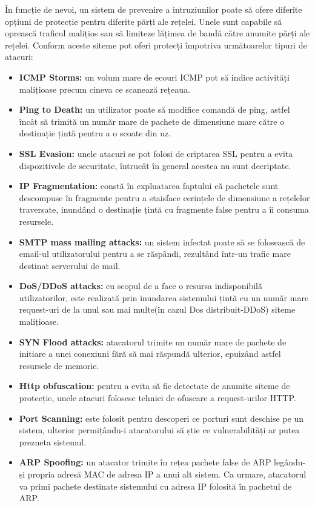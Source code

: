 În funcție de nevoi, un sistem de prevenire a intruziunilor poate să ofere diferite opțiuni de protecție pentru diferite părți ale rețelei. Unele sunt capabile să oprească traficul malițios sau să limiteze lățimea de bandă către anumite părți ale rețelei. Conform \cite{ips_sec_types} aceste siteme pot oferi protecți împotriva următoarelor tipuri de atacuri: 
\begin{itemize}
	\item \textbf{ICMP Storms:}  un volum mare de ecouri ICMP pot să indice activități malițioase precum cineva ce scanează rețeaua. 
	\item \textbf{Ping to Death:}  un utilizator poate să modifice comandă de ping, astfel încât să trimită un număr mare de pachete de dimensiune mare către o destinație țintă pentru a o scoate din uz. 
	\item \textbf{SSL Evasion:}  unele atacuri se pot folosi de criptarea SSL pentru a evita dispozitivele de securitate, întrucât în general acestea nu sunt decriptate. 
	\item \textbf{IP Fragmentation:}  constă în expluatarea faptului că pachetele sunt descompuse în fragmente pentru a staisface cerințele de dimensiune a rețelelor traversate, inundând o destinație țintă cu fragmente false pentru a îi consuma resursele.  
	\item \textbf{SMTP mass mailing attacks:}  un sistem infectat poate să se folosească de email-ul utilizatorului pentru a se răspândi, rezultând într-un trafic mare destinat serverului de mail. 
	\item \textbf{DoS/DDoS attacks:} cu scopul de a face o resursa indisponibilă utilizatorilor, este realizată prin inundarea sistemului țintă cu un număr mare request-uri de la unul sau mai multe(în cazul Dos distribuit-DDoS) siteme malițioase. 
	\item \textbf{SYN Flood attacks:}  atacatorul trimite un număr mare de pachete de initiare a unei conexiuni fără să mai răspundă ulterior, epuizând astfel resursele de memorie. 
	\item \textbf{Http obfuscation:}  pentru a evita să fie detectate de anumite siteme de protecție, unele atacuri folosesc tehnici de ofuscare a request-urilor HTTP. 
	\item \textbf{Port Scanning:}  este folosit pentru descoperi ce porturi sunt deschise pe un sistem, ulterior permițându-i atacatorului să știe ce vulnerabilități ar putea prezneta sistemul. 
	\item \textbf{ARP Spoofing:}  un atacator trimite în rețea pachete false de ARP legându-și propria adresă MAC de adresa IP a unui alt sistem. Ca urmare, atacatorul va primi pachete destinate sistemului cu adresa IP folosită în pachetul de ARP. 

\end{itemize}
